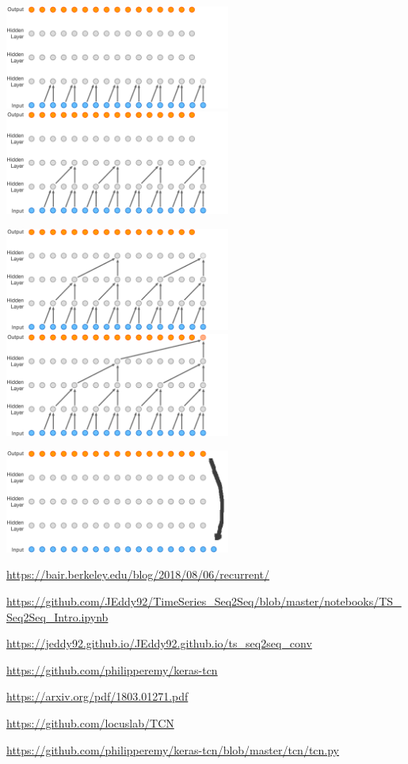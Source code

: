 \documentclass[12pt,fleqn]{article}\usepackage{../../common}
\begin{document}
\vspace{3em}

\includegraphics[width=20em]{wave-104.png}
\includegraphics[width=20em]{wave-119.png}

\vspace{3em}

\includegraphics[width=20em]{wave-134.png}
\includegraphics[width=20em]{wave-149.png}

\vspace{3em}

\includegraphics[width=20em]{wave-179.png}









\url{https://bair.berkeley.edu/blog/2018/08/06/recurrent/}

\url{https://github.com/JEddy92/TimeSeries_Seq2Seq/blob/master/notebooks/TS_Seq2Seq_Intro.ipynb}

\url{https://jeddy92.github.io/JEddy92.github.io/ts_seq2seq_conv}

\url{https://github.com/philipperemy/keras-tcn}

\url{https://arxiv.org/pdf/1803.01271.pdf}

\url{https://github.com/locuslab/TCN}

\url{https://github.com/philipperemy/keras-tcn/blob/master/tcn/tcn.py}
\end{document}
